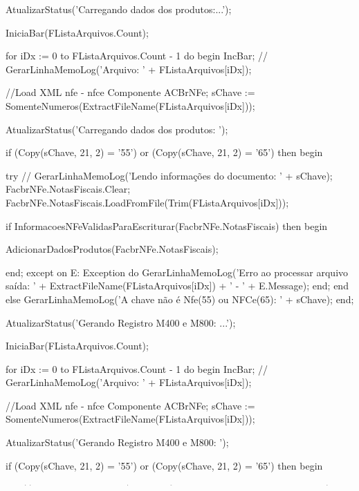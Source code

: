    AtualizarStatus('Carregando dados dos produtos:...');

   IniciaBar(FListaArquivos.Count);

   for iDx := 0 to FListaArquivos.Count - 1 do
      begin
         IncBar;
        // GerarLinhaMemoLog('Arquivo: ' + FListaArquivos[iDx]);


         //Load XML nfe - nfce Componente ACBrNFe;
         sChave := SomenteNumeros(ExtractFileName(FListaArquivos[iDx]));

         AtualizarStatus('Carregando dados dos produtos: ');

         if (Copy(sChave, 21, 2) = '55') or (Copy(sChave, 21, 2) = '65') then
            begin

               try
                 // GerarLinhaMemoLog('Lendo informações do documento: ' + sChave);
                  FacbrNFe.NotasFiscais.Clear;
                  FacbrNFe.NotasFiscais.LoadFromFile(Trim(FListaArquivos[iDx]));

                  if InformacoesNFeValidasParaEscriturar(FacbrNFe.NotasFiscais) then
                     begin

                        AdicionarDadosProdutos(FacbrNFe.NotasFiscais);

                     end;
               except
                  on E: Exception do
                     GerarLinhaMemoLog('Erro ao processar arquivo saída: ' + ExtractFileName(FListaArquivos[iDx]) + ' - ' + E.Message);
               end;
            end
         else
           GerarLinhaMemoLog('A chave não é Nfe(55) ou NFCe(65): ' + sChave);
      end;



   AtualizarStatus('Gerando Registro M400 e M800: ...');

   IniciaBar(FListaArquivos.Count);

   for iDx := 0 to FListaArquivos.Count - 1 do
      begin
         IncBar;
        // GerarLinhaMemoLog('Arquivo: ' + FListaArquivos[iDx]);


         //Load XML nfe - nfce Componente ACBrNFe;
         sChave := SomenteNumeros(ExtractFileName(FListaArquivos[iDx]));

         AtualizarStatus('Gerando Registro M400 e M800: ');

         if (Copy(sChave, 21, 2) = '55') or (Copy(sChave, 21, 2) = '65') then
            begin

               try
                //  GerarLinhaMemoLog('Lendo informações do documento: ' + sChave);
                  FacbrNFe.NotasFiscais.Clear;
                  FacbrNFe.NotasFiscais.LoadFromFile(Trim(FListaArquivos[iDx]));

